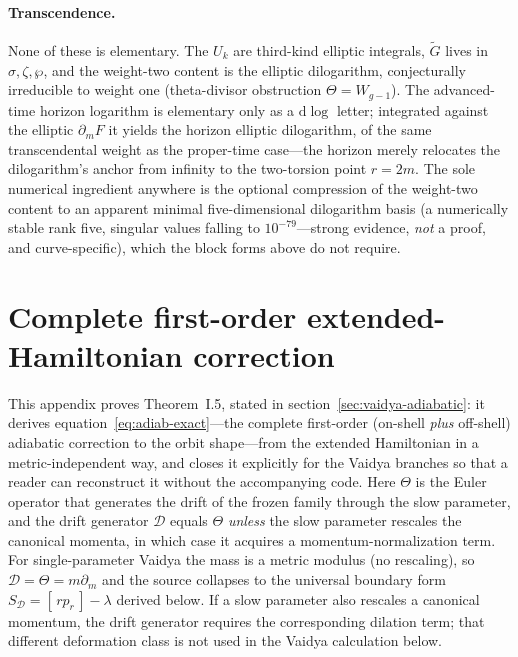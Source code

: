 \documentclass[12pt]{iopart}
\newcommand{\dd}{\mathrm{d}}
\begin{document}
\paragraph{Transcendence.}
None of these is elementary. The $U_k$ are third-kind elliptic integrals, $\tilde G$
lives in $\sigma,\zeta,\wp$, and the weight-two content is the elliptic dilogarithm,
conjecturally irreducible to weight one (theta-divisor obstruction $\Theta=W_{g-1}$). The
advanced-time horizon logarithm is elementary only as a $\dd\log$ letter; integrated
against the elliptic $\partial_m F$ it yields the horizon elliptic dilogarithm, of the
same transcendental weight as the proper-time case---the horizon merely relocates the
dilogarithm's anchor from infinity to the two-torsion point $r=2m$. The sole
numerical ingredient anywhere is the optional compression of the weight-two content to
an apparent minimal five-dimensional dilogarithm basis (a numerically stable rank five,
singular values falling to $10^{-79}$---strong evidence, \emph{not} a proof, and
curve-specific), which the block forms above do not require.

\FloatBarrier


\section{Complete first-order extended-Hamiltonian correction}
\label{app:firstorder}

This appendix proves Theorem~I.5, stated in section~\ref{sec:vaidya-adiabatic}: it derives
equation~\eqref{eq:adiab-exact}---the complete first-order (on-shell \emph{plus} off-shell)
adiabatic correction to the orbit shape---from the extended Hamiltonian in a
metric-independent way, and closes it explicitly for the Vaidya branches so that a reader
can reconstruct it without the accompanying code. Here $\Theta$ is the Euler operator that
generates the drift of the frozen family through the slow parameter, and the drift
generator $\mathcal D$ equals $\Theta$ \emph{unless} the slow parameter rescales the
canonical momenta, in which case it acquires a momentum-normalization term. For
single-parameter Vaidya the mass is a metric modulus (no rescaling), so
$\mathcal D=\Theta=m\partial_m$ and the source collapses to the universal boundary form
$S_{\mathcal D}=[\,rp_r\,]-\lambda$ derived below. If a slow parameter also rescales a
canonical momentum, the drift generator requires the corresponding dilation term; that
different deformation class is not used in the Vaidya calculation below.
\end{document}
